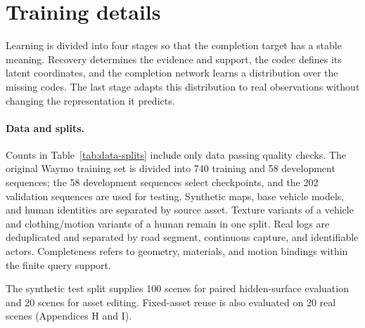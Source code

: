 \section{Training details}
\label{sec:supp-training}

Learning is divided into four stages so that the completion target has a stable meaning. Recovery determines the evidence and support, the codec defines its latent coordinates, and the completion network learns a distribution over the missing codes. The last stage adapts this distribution to real observations without changing the representation it predicts.

\paragraph{Data and splits.}
Counts in Table~\ref{tab:data-splits} include only data passing quality checks. The original Waymo training set is divided into 740 training and 58 development sequences; the 58 development sequences select checkpoints, and the 202 validation sequences are used for testing. Synthetic maps, base vehicle models, and human identities are separated by source asset. Texture variants of a vehicle and clothing/motion variants of a human remain in one split. Real logs are deduplicated and separated by road segment, continuous capture, and identifiable actors. Completeness refers to geometry, materials, and motion bindings within the finite query support.

The synthetic test split supplies 100 scenes for paired hidden-surface evaluation and 20 scenes for asset editing. Fixed-asset reuse is also evaluated on 20 real scenes (Appendices H and I).

